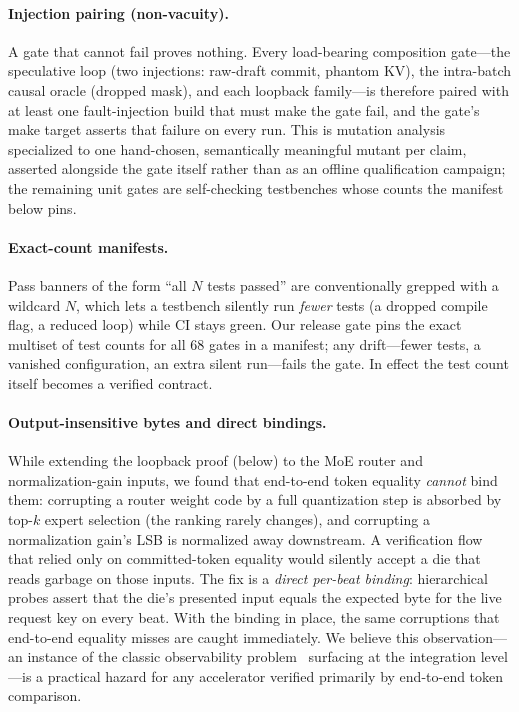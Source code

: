 \documentclass[11pt]{article}
\begin{document}
\paragraph{Injection pairing (non-vacuity).} A gate that cannot fail proves
nothing. Every load-bearing composition gate---the speculative loop (two
injections: raw-draft commit, phantom KV), the intra-batch causal oracle
(dropped mask), and each loopback family---is therefore paired with at least
one fault-injection build that must make the gate fail, and the gate's make
target asserts that failure on every run. This is mutation
analysis~\cite{mutation,mcy} specialized to one hand-chosen, semantically
meaningful mutant per claim, asserted alongside the gate itself rather than as
an offline qualification campaign; the remaining unit gates are self-checking
testbenches whose counts the manifest below pins.

\paragraph{Exact-count manifests.} Pass banners of the form ``all $N$ tests
passed'' are conventionally grepped with a wildcard $N$, which lets a
testbench silently run \emph{fewer} tests (a dropped compile flag, a reduced
loop) while CI stays green. Our release gate pins the exact multiset of test
counts for all 68 gates in a manifest; any drift---fewer tests, a vanished
configuration, an extra silent run---fails the gate. In effect the test count
itself becomes a verified contract.

\paragraph{Output-insensitive bytes and direct bindings.} While extending the
loopback proof (below) to the MoE router and normalization-gain inputs, we
found that end-to-end token equality \emph{cannot} bind them: corrupting a
router weight code by a full quantization step is absorbed by top-$k$ expert
selection (the ranking rarely changes), and corrupting a normalization gain's
LSB is normalized away downstream. A verification flow that relied only on
committed-token equality would silently accept a die that reads garbage on
those inputs. The fix is a \emph{direct per-beat binding}: hierarchical probes
assert that the die's presented input equals the expected byte for the live
request key on every beat. With the binding in place, the same corruptions that
end-to-end equality misses are caught immediately. We believe this
observation---an instance of the classic observability
problem~\cite{occom} surfacing at the integration level---is a practical
hazard for any accelerator verified primarily by end-to-end token comparison.
\end{document}
